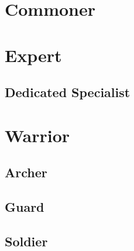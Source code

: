 \documentclass[11pt]{report}
\begin{document}
\section{Commoner}

\section{Expert}
\subsection{Dedicated Specialist}

\section{Warrior}
\subsection{Archer}
\subsection{Guard}
\subsection{Soldier}
\end{document}
